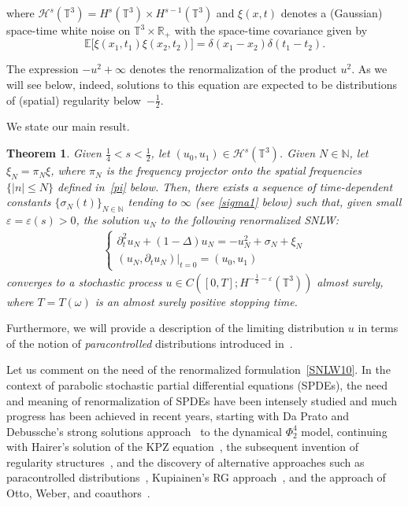\documentclass[%
11pt,  reqno]{amsart}
\newtheorem{theorem}{Theorem} [section]
\newcommand{\1}{\hspace{0.2mm}\text{I}\hspace{0.2mm}}
\newcommand{\noi}{\noindent}
\newcommand{\R}{\mathbb{R}}
\newcommand{\T}{\mathbb{T}}
\newcommand{\E}{\mathbb{E}}
\newcommand{\dl}{\delta}
\newcommand{\Dl}{\Delta}
\newcommand{\eps}{\varepsilon}
\newcommand{\s}{\sigma}
\newcommand{\dt}{\partial_t}
\renewcommand{\o}{\omega}
\newcommand{\N}{\mathbb{N}}
\renewcommand{\H}{\mathcal{H}}
\numberwithin{equation}{section}
\numberwithin{theorem}{section}
\begin{document}
\noi
where  $\H^s(\T^3) = H^s(\T^3)\times H^{s-1}(\T^3)$
 and $\xi(x, t)$ denotes a (Gaussian) space-time white noise on $\T^3\times \R_+$
with the space-time covariance given by
\[ \E\big[ \xi(x_1, t_1) \xi(x_2, t_2) \big]
= \dl(x_1 - x_2) \dl (t_1 - t_2).\]

\noi
The expression $-u^2+\infty$ denotes the renormalization of the product $u^2$. 
As we will see below, indeed, solutions to this equation are expected to be distributions 
of (spatial) regularity below~$-\frac12$. 


We state our main result.

\begin{theorem}\label{THM:2-intro}
Given $\frac 14 < s < \frac 12$, 
let $(u_0, u_1) \in \H^{s}(\T^3)$.
Given $N \in \N$, let $ \xi_N =  \pi_N \xi$, 
where $\pi_N$ is the frequency projector onto the spatial frequencies $\{|n|\leq N\}$
defined in~\eqref{pi} below.
Then,  there exists a sequence of time-dependent constants $\{\s_N(t)\}_{N\in \N}$
 tending to $\infty$ \textup{(}see \eqref{sigma1} below\textup{)} such that, given small $\eps = \eps(s) > 0$, 
the solution $u_N$ to the following renormalized SNLW:
\begin{align}
\begin{cases}
\dt^2 u_N + (1-  \Dl)  u_N  =  - u_N^2  + \s_N+ \xi_N\\
(u_N, \dt u_N)|_{t = 0} = (u_0, u_1)
\end{cases}
\label{SNLW10}
\end{align}
converges to a stochastic process $u \in C([0, T]; H^{-\frac 12 -\eps} (\T^3))$ almost surely,
where $T = T(\o)$ is an almost surely positive stopping time.
\end{theorem}


Furthermore, 
 we will provide a description of the limiting distribution $u$ in terms of the notion of 
 \emph{paracontrolled} distributions introduced in~\cite{GIP}. 

Let us comment on the need of the renormalized formulation~\eqref{SNLW10}. 
In the context of parabolic stochastic partial differential equations (SPDEs),  the need and meaning of renormalization of SPDEs have been intensely studied and much progress has been achieved
in recent years, starting with Da Prato and Debussche's strong solutions approach~\cite{DPD2} to the dynamical $\Phi^4_2$ model, continuing with Hairer's solution of the KPZ equation~\cite{Hairer0}, the subsequent invention of regularity structures~\cite{Hairer},
 and the discovery of alternative approaches such as paracontrolled distributions~\cite{GIP}, Kupiainen's RG approach~\cite{Kupi, kupiainen_renormalization_2017},
and  the approach of Otto, Weber, and coauthors~\cite{otto_quasilinear_2016, bailleul_quasilinear_2016, otto_parabolic_2018}. 
\end{document}
